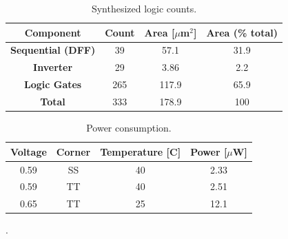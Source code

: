		\begin{table}[htb!]
			\centering
			\def\arraystretch{1.5}		
			\setlength\arrayrulewidth{0.75pt}
			\setlength{\tabcolsep}{1em} %
			\begin{tabular}{|c|c|c|c|}
				\hline 
				\rule[-1ex]{0pt}{2.5ex} \cellcolor{gray!40}\textbf{Component} & \cellcolor{gray!40}\textbf{Count } & \cellcolor{gray!40}\textbf{Area [$\mu$m$^2$]}& \cellcolor{gray!40}\textbf{Area (\% total)}\\ 
				\hline 
				\rule[-1ex]{0pt}{2.5ex} \textbf{Sequential (DFF)} &  39 & 57.1 & 31.9 \\ 
				\hline 
				\rule[-1ex]{0pt}{2.5ex} \textbf{Inverter} & 29 & 3.86 & 2.2  \\ 
				\hline 
				\rule[-1ex]{0pt}{2.5ex} \textbf{Logic Gates} & 265 & 117.9 & 65.9  \\ 
				\hline 
				\rule[-1ex]{0pt}{2.5ex} \textbf{Total} & 333 & 178.9 & 100  \\ 
				\hline 
			\end{tabular} 
			\caption{Synthesized logic counts.}
			\label{tab:log_synth}
		\end{table}   

		\begin{table}[htb!]
			\centering
			\def\arraystretch{1.5}		
			\setlength\arrayrulewidth{0.75pt}
			\setlength{\tabcolsep}{1em} %
			\begin{tabular}{|c|c|c|c|}
				\hline 
				\rule[-1ex]{0pt}{2.5ex} \cellcolor{gray!40}\textbf{Voltage} & \cellcolor{gray!40}\textbf{Corner} & \cellcolor{gray!40}\textbf{Temperature [C]}& \cellcolor{gray!40}\textbf{Power [$\mu$W]}\\ 
				\hline 
				\rule[-1ex]{0pt}{2.5ex} 0.59 & SS & 40 & 2.33 \\ 
				\hline 
				\rule[-1ex]{0pt}{2.5ex} 0.59 & TT & 40 & 2.51  \\ 
				\hline 
				\rule[-1ex]{0pt}{2.5ex} 0.65 & TT & 25 & 12.1  \\ 
				\hline 
			\end{tabular} 
			\caption{Power consumption.}
			\label{tab:log_synth_power}
		\end{table}   

\FloatBarrier
{\color{white}.}